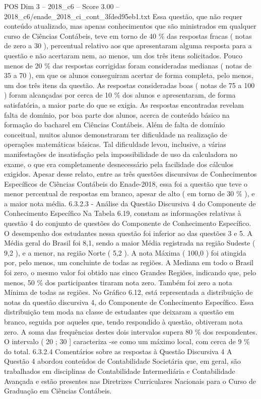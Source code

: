 \begin{textsample}{POS Dim 3 – 2018\_c6 – Score 3.00 – 2018\_c6/enade\_2018\_ci\_cont\_3fded95eb1.txt}
Essa questão, que não requer conteúdo atualizado, mas apenas conhecimentos que são ministrados em qualquer curso de Ciências Contábeis, teve em torno de 40 \% das respostas fracas ( notas de zero a 30 ), percentual relativo aos que apresentaram alguma resposta para a questão e não acertaram nem, ao menos, um dos três itens solicitados.
Pouco menos de 20 \% das respostas corrigidas foram consideradas medianas ( notas de 35 a 70 ), em que os alunos conseguiram acertar de forma completa, pelo menos, um dos três itens da questão.
As respostas consideradas boas ( notas de 75 a 100 ) foram alcançadas por cerca de 10 \% dos alunos e apresentaram, de forma satisfatória, a maior parte do que se exigia.
As respostas encontradas revelam falta de domínio, por boa parte dos alunos, acerca de conteúdo básico na formação do bacharel em Ciências Contábeis.
Além de falta de domínio conceitual, muitos alunos demonstraram ter dificuldade na realização de operações matemáticas básicas.
Tal dificuldade levou, inclusive, a várias manifestações de insatisfação pela impossibilidade de uso da calculadora no exame, o que era completamente desnecessário pela facilidade dos cálculos exigidos.
Apesar desse relato, entre as três questões discursivas de Conhecimentos Específicos de Ciências Contábeis do Enade-2018, essa foi a questão que teve o menor percentual de respostas em branco, apesar de alto ( em torno de 30 \% ), e a maior nota média. 6.3.2.3 - Análise da Questão Discursiva 4 do Componente de Conhecimento Específico Na Tabela 6.19, constam as informações relativas à questão 4 do conjunto de questões do Componente de Conhecimento Específico.
O desempenho dos estudantes nessa questão foi inferior ao das questões 3 e 5.
A Média geral do Brasil foi 8,1, sendo a maior Média registrada na região Sudeste ( 9,2 ), e a menor, na região Norte ( 5,2 ).
A nota Máxima ( 100,0 ) foi atingida por, pelo menos, um concluinte de todas as regiões.
A Mediana em todo o Brasil foi zero, o mesmo valor foi obtido nas cinco Grandes Regiões, indicando que, pelo menos, 50 \% dos participantes tiraram nota zero.
Também foi zero a nota Mínima de todas as regiões.
No Gráfico 6.12, está representada a distribuição de notas da questão discursiva 4, do Componente de Conhecimento Específico.
Essa distribuição tem moda na classe de estudantes que deixaram a questão em branco, seguida por aqueles que, tendo respondido à questão, obtiveram nota zero.
A soma das frequências destes dois intervalos supera 80 \% dos respondentes.
O intervalo ( 20 ; 30 ] caracteriza -se como um máximo local, com cerca de 9 \% do total. 6.3.2.4 Comentários sobre as respostas à Questão Discursiva 4 A Questão 4 abordou conteúdos de Contabilidade Societária que, em geral, são trabalhados em disciplinas de Contabilidade Intermediária e Contabilidade Avançada e estão presentes nas Diretrizes Curriculares Nacionais para o Curso de Graduação em Ciências Contábeis.

\end{textsample}
